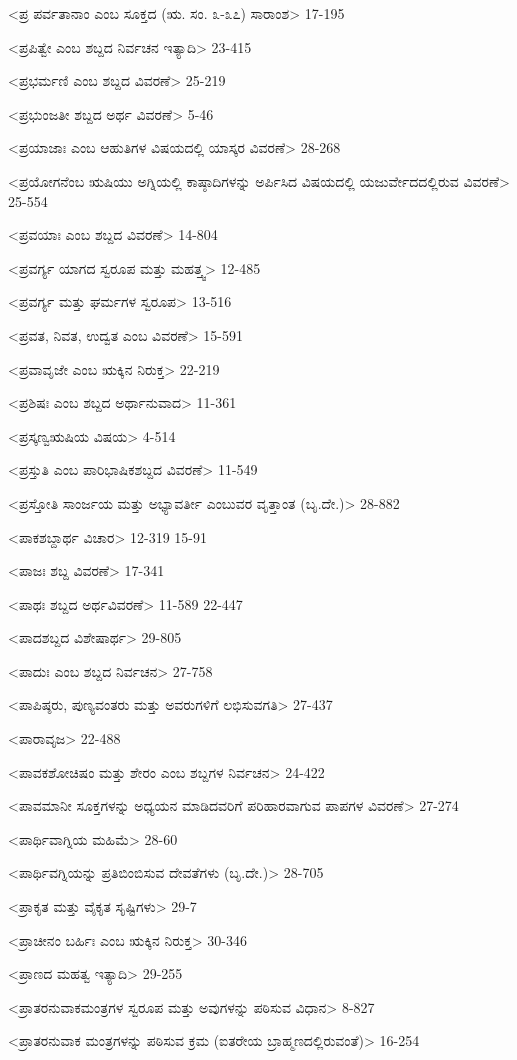 <ಪ್ರ ಪರ್ವತಾನಾಂ ಎಂಬ ಸೂಕ್ತದ (ಋ. ಸಂ. ೩-೩೭) ಸಾರಾಂಶ>
17-195

<ಪ್ರಪಿತ್ವೇ ಎಂಬ ಶಬ್ದದ ನಿರ್ವಚನ ಇತ್ಯಾದಿ>
23-415

<ಪ್ರಭರ್ಮಣಿ ಎಂಬ ಶಬ್ದದ ವಿವರಣೆ>
25-219

<ಪ್ರಭುಂಜತೀ ಶಬ್ದದ ಅರ್ಥ ವಿವರಣೆ>
5-46

<ಪ್ರಯಾಜಾಃ ಎಂಬ ಆಹುತಿಗಳ ವಿಷಯದಲ್ಲಿ ಯಾಸ್ಕರ ವಿವರಣೆ>
28-268

<ಪ್ರಯೋಗನೆಂಬ ಋಷಿಯು ಅಗ್ನಿಯಲ್ಲಿ ಕಾಷ್ಠಾದಿಗಳನ್ನು ಅರ್ಪಿಸಿದ ವಿಷಯದಲ್ಲಿ ಯಜುರ್ವೇದದಲ್ಲಿರುವ ವಿವರಣೆ>
25-554

<ಪ್ರವಯಾಃ ಎಂಬ ಶಬ್ದದ ವಿವರಣೆ>
14-804

<ಪ್ರವರ್ಗ್ಯ ಯಾಗದ ಸ್ವರೂಪ ಮತ್ತು ಮಹತ್ತ್ವ>
12-485

<ಪ್ರವರ್ಗ್ಯ ಮತ್ತು ಘರ್ಮಗಳ ಸ್ವರೂಪ>
13-516

<ಪ್ರವತ, ನಿವತ, ಉದ್ವತ ಎಂಬ ವಿವರಣೆ>
15-591

<ಪ್ರವಾವೃಜೇ ಎಂಬ ಋಕ್ಕಿನ ನಿರುಕ್ತ>
22-219

<ಪ್ರಶಿಷಃ ಎಂಬ ಶಬ್ದದ ಅರ್ಥಾನುವಾದ>
11-361

<ಪ್ರಸ್ಕಣ್ವಋಷಿಯ ವಿಷಯ>
4-514

<ಪ್ರಸ್ತುತಿ ಎಂಬ ಪಾರಿಭಾಷಿಕಶಬ್ದದ ವಿವರಣೆ>
11-549

<ಪ್ರಸ್ತೋತಿ ಸಾಂರ್ಜಯ ಮತ್ತು ಅಭ್ಯಾವರ್ತೀ ಎಂಬುವರ ವೃತ್ತಾಂತ (ಬೃ.ದೇ.)>
28-882

<ಪಾಕಶಬ್ದಾರ್ಥ ವಿಚಾರ>
12-319
15-91

<ಪಾಜಃ ಶಬ್ದ ವಿವರಣೆ>
17-341

<ಪಾಥಃ ಶಬ್ದದ ಅರ್ಥವಿವರಣೆ>
11-589 
22-447

<ಪಾದಶಬ್ದದ ವಿಶೇಷಾರ್ಥ>
29-805

<ಪಾದುಃ ಎಂಬ ಶಬ್ದದ ನಿರ್ವಚನ>
27-758

<ಪಾಪಿಷ್ಠರು, ಪುಣ್ಯವಂತರು ಮತ್ತು ಅವರುಗಳಿಗೆ ಲಭಿಸುವಗತಿ>
27-437

<ಪಾರಾವೃಜ>
22-488

<ಪಾವಕಶೋಚಿಷಂ ಮತ್ತು ಶೇರಂ ಎಂಬ ಶಬ್ದಗಳ ನಿರ್ವಚನ>
24-422

<ಪಾವಮಾನೀ ಸೂಕ್ತಗಳನ್ನು ಅಧ್ಯಯನ ಮಾಡಿದವರಿಗೆ ಪರಿಹಾರವಾಗುವ ಪಾಪಗಳ ವಿವರಣೆ>
27-274

<ಪಾರ್ಥಿವಾಗ್ನಿಯ ಮಹಿಮೆ>
28-60

<ಪಾರ್ಥಿವಗ್ನಿಯನ್ನು ಪ್ರತಿಬಿಂಬಿಸುವ ದೇವತೆಗಳು (ಬೃ.ದೇ.)>
28-705

<ಪ್ರಾಕೃತ ಮತ್ತು ವೈಕೃತ ಸೃಷ್ಟಿಗಳು>
29-7

<ಪ್ರಾಚೀನಂ ಬರ್ಹಿಃ ಎಂಬ ಋಕ್ಕಿನ ನಿರುಕ್ತ>
30-346

<ಪ್ರಾಣದ ಮಹತ್ವ ಇತ್ಯಾದಿ>
29-255

<ಪ್ರಾತರನುವಾಕಮಂತ್ರಗಳ ಸ್ವರೂಪ ಮತ್ತು ಅವುಗಳನ್ನು ಪಠಿಸುವ ವಿಧಾನ>
8-827

<ಪ್ರಾತರನುವಾಕ ಮಂತ್ರಗಳನ್ನು ಪಠಿಸುವ ಕ್ರಮ (ಐತರೇಯ ಬ್ರಾಹ್ಮಣದಲ್ಲಿರುವಂತೆ)>
16-254

